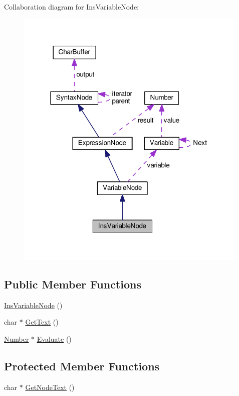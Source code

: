 Collaboration diagram for Ins\+Variable\+Node\+:
\nopagebreak
\begin{figure}[H]
\begin{center}
\leavevmode
\includegraphics[width=316pt]{da/d09/classInsVariableNode__coll__graph}
\end{center}
\end{figure}
\subsection*{Public Member Functions}
\begin{DoxyCompactItemize}
\item 
\hyperlink{classInsVariableNode_a76772ab88bcb3dd4d8f5b299ed4bf8ee}{Ins\+Variable\+Node} ()
\item 
char $\ast$ \hyperlink{classInsVariableNode_a5b116b7004cd061536a4ed3dc2a06abb}{Get\+Text} ()
\item 
\hyperlink{structNumber}{Number} $\ast$ \hyperlink{classInsVariableNode_aad01cefd8321d0a6ddaf0d4ef5e62ddf}{Evaluate} ()
\end{DoxyCompactItemize}
\subsection*{Protected Member Functions}
\begin{DoxyCompactItemize}
\item 
char $\ast$ \hyperlink{classInsVariableNode_a38651b169dbcb8ff1b40546facb88017}{Get\+Node\+Text} ()
\end{DoxyCompactItemize}
